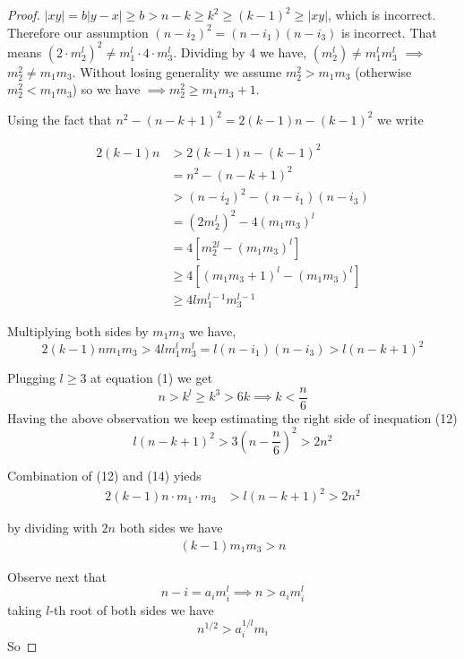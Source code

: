 \documentclass[a4paper]{article}
\begin{document}
\begin{proof}
$|xy| = b|y-x| \geq b > n-k \geq k^2 \geq (k-1)^2 \geq |xy|$, which is incorrect. Therefore our assumption $(n-i_2)^2 = (n-i_1)(n-i_3)$ is incorrect. That means $(2\cdot m_2^{l})^2 \neq m_1^l \cdot 4\cdot m_3^l$.
Dividing by 4 we have, $( m_2^{l}) \neq m_1^l m_3^l$ $\implies$ $m_2^{2} \neq m_1 m_3$. Without losing generality we assume $m_2^{2} > m_1 m_3$ (otherwise $m_2^{2} < m_1 m_{3} $) so we have $\implies m_2^{2} \geq m_1 m_3 +1$.

Using the fact that  $n^2 - (n-k+1)^2=2(k-1)n - (k-1)^2$ we write

\begin{align*}\label{ineq}
  2(k-1)n &>2(k-1)n -(k-1)^2 \\ \nonumber
  &= n^2 - (n-k+1)^2\\ \nonumber
  &> (n-i_2)^2 - (n-i_1)(n-i_3) \\ \nonumber
 &= (2m_2^{l})^2 - 4(m_1 m_3)^l\\ \nonumber
 &=  4[m_2^{2l} - (m_1 m_3)^l] \\ \nonumber
 &\geq 4[(m_1 m_3 + 1)^l - (m_1 m_3)^l] \\\nonumber
 &\geq 4lm_1^{l-1} m_3^{l-1}
\end{align*}

Multiplying both sides by $m_1 m_3$ we have,
\begin{equation}
2(k-1)nm_1 m_3 > 4lm_1^{l} m_3^{l} = l(n-i_1)(n-i_3)
> l(n-k+1)^2
\end{equation}

Plugging $l \geq 3$ at equation (1) we get
\begin{equation}
n>k^l\geq k^3 > 6k \implies k< \frac{n}{6}
\end{equation}
Having the above observation we keep estimating the right side of inequation (12)
\begin{equation}
 l(n-k+1)^2 > 3(n-\frac{n}{6})^2 >2n^{2}
\end{equation}
 
 Combination of (12) and (14) yieds
 \begin{align*}
 2(k-1)n\cdot m_{1}\cdot m_{3}&>l{(n-k+1)}^2>2n^2
 \end{align*}

by dividing with $2n$ both sides we have
\begin{align}
(k-1)m_{1}m_{3}>n
\end{align}

Observe next that
$$n-i = a_i m_i^l \implies n > a_i m_i^l $$
taking $l$-th root of both sides  we have 
\begin{equation*}
n^{1/2}> a_i^{1/l}m_i 
\end{equation*}
So 


\end{proof}
\end{document}
